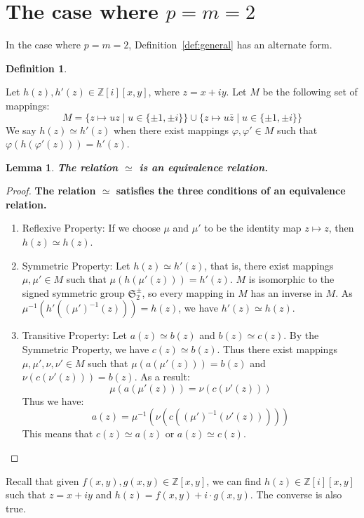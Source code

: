 \documentclass[12pt]{article}
\newtheorem{lemma}[theorem]{Lemma}
\theoremstyle{definition}
\newtheorem{definition}[theorem]{Definition}
\numberwithin{equation}{section}
\begin{document}
\section{The case where \( p = m = 2\)}


In the case where \( p = m = 2\), Definition~\ref{def:general} has an alternate form.



\begin{definition}
\label{def:2D}

Let \( h(z), h'(z) \in \mathbb{Z} [i][x,y] \),
where \( z = x + iy \).
Let \( M \) be the following set of mappings: 
\[
M = \{ z \mapsto uz \mid u \in \{ \pm 1, \pm i \} \}  
\cup \{ z\mapsto u \bar{z} \mid u \in \{ \pm 1, \pm i \} \}  
\]
We say \( h(z) \simeq h'(z) \) when there exist mappings \( \varphi, \varphi' \in M \)
such that \( \varphi( h( \varphi'( z ) ) )  = h'(z) \).


\end{definition}

\begin{lemma}
\bf
The relation \( \simeq \) is an equivalence relation.
\end{lemma}

\begin{proof}
\bf
The relation \( \simeq \) satisfies the three conditions of an equivalence relation.
\begin{enumerate}
\item Reflexive Property: If we choose \( \mu \) and \( \mu'\) to be the identity map \( z \mapsto z \), 
then \( h(z) \simeq h(z) \).

\item Symmetric Property: Let  \( h(z) \simeq h'(z) \), that is, there exist mappings 
\( \mu, \mu' \in M \)
such that \( \mu( h( \mu'( z ) ) )  = h'(z) \).
\(M\) is isomorphic to the signed symmetric group \( \mathfrak{S}_2^\pm \), so every mapping in \(M\)
has an inverse in \(M\). As  \( \mu^{-1}( h'( (\mu')^{-1}( z ) ) )  = h(z) \),
we have \( h'(z) \simeq h(z) \).

\item Transitive Property: Let \( a(z) \simeq b(z) \) and \( b(z) \simeq c(z) \). By the 
Symmetric Property, we have \( c(z) \simeq b(z) \). Thus there exist mappings
\( \mu, \mu', \nu, \nu' \in M \) such that \( \mu( a( \mu'( z ) ) )  = b(z) \) and 
\( \nu( c( \nu'( z ) ) )  = b(z) \). As a result:
\[
\mu( a( \mu'( z ) ) ) = \nu( c( \nu'( z ) ) )  
\]
Thus we have: 
\[
a(  z  ) = \mu^{-1}( \nu( c( (\mu')^{-1}( \nu'( z ) ) ) ) )
\]
This means that \( c(z) \simeq a(z) \) or \( a(z) \simeq c(z) \).
\end{enumerate}
\end{proof}
Recall that given \( f(x,y), g(x,y) \in \mathbb{Z}[x,y] \),
we can find \( h(z) \in \mathbb{Z} [i][x,y] \)
such that
\( z = x + iy \)
and
\( h(z) = f(x,y) + i \cdot g(x,y) \). 
The converse is also true.
\end{document}
